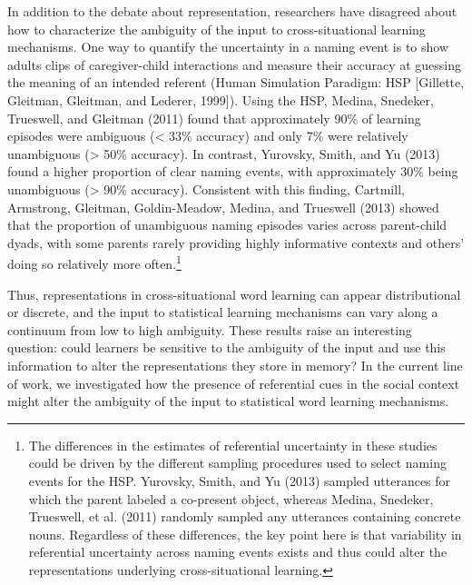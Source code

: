 \documentclass[authoryear, review]{elsarticle}
\providecommand{\DIFaddtex}[1]{{\protect\color{blue}\uwave{#1}}} %
\providecommand{\DIFaddbegin}{} %
\providecommand{\DIFaddend}{} %
\providecommand{\DIFadd}[1]{\texorpdfstring{\DIFaddtex{#1}}{#1}} %
\begin{document}
In addition to the debate about representation, researchers have
disagreed about how to characterize the ambiguity of the input to
cross-situational learning mechanisms. One way to quantify the
uncertainty in a naming event is to show adults \DIFaddbegin \DIFadd{video }\DIFaddend clips of
caregiver-child interactions and measure their accuracy at guessing the
meaning of an intended referent (Human Simulation Paradigm: HSP
{[}Gillette, Gleitman, Gleitman, and Lederer, 1999{]}). Using the HSP,
Medina, Snedeker, Trueswell, and Gleitman (2011) found that
approximately 90\% of learning episodes were ambiguous (\textless{} 33\%
accuracy) and only 7\% were relatively unambiguous (\textgreater{} 50\%
accuracy). In contrast, Yurovsky, Smith, and Yu (2013) found a higher
proportion of clear naming events, with approximately 30\% being
unambiguous (\textgreater{} 90\% accuracy). Consistent with this
finding, Cartmill, Armstrong, Gleitman, Goldin-Meadow, Medina, and
Trueswell (2013) showed that the proportion of unambiguous naming
episodes varies across parent-child dyads, with some parents rarely
providing highly informative contexts and others' doing so relatively
more often.\footnote{The differences in the estimates of referential
  uncertainty in these studies could be driven by the different sampling
  procedures used to select naming events for the HSP. Yurovsky, Smith,
  and Yu (2013) sampled utterances for which the parent labeled a
  co-present object, whereas Medina, Snedeker, Trueswell, et al. (2011)
  randomly sampled any utterances containing concrete nouns. Regardless
  of these differences, the key point here is that variability in
  referential uncertainty across naming events exists and thus could
  alter the representations underlying cross-situational learning.}

Thus, representations in cross-situational word learning can appear
distributional or discrete, and the input to statistical learning
mechanisms can vary along a continuum from low to high ambiguity. These
results raise an interesting question: could learners be sensitive to
the ambiguity of the input and use this information to alter the
representations they store in memory? In the current line of work, we
investigated how the presence of referential cues in the social context
might alter the ambiguity of the input to statistical word learning
mechanisms.
\end{document}
